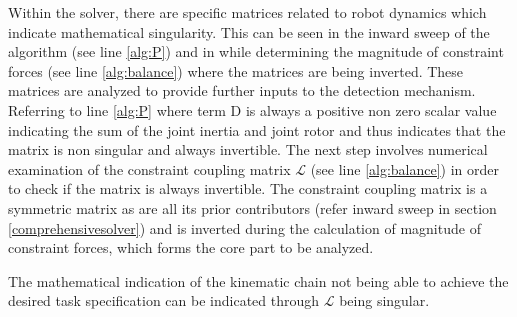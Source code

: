 Within the solver, there are specific matrices related to robot dynamics which indicate mathematical singularity. This can be seen in the inward sweep of the algorithm (see line \ref{alg:P}) and in while determining the magnitude of constraint forces (see line \ref{alg:balance}) where the matrices are being inverted. These matrices are analyzed to provide further inputs to the detection mechanism. Referring to line \ref{alg:P} where term D is always a positive non zero scalar value indicating the sum of the joint inertia and joint rotor and thus indicates that the matrix is non singular and always invertible. The next step involves numerical examination of the constraint coupling matrix $\mathcal{L}$ (see line \ref{alg:balance}) in order to check if the matrix is always invertible. The constraint coupling matrix is a symmetric matrix as are all its prior contributors (refer inward sweep in section \ref{comprehensivesolver}) and is inverted during the calculation of magnitude of constraint forces, which forms the core part to be analyzed. 
 
The mathematical indication of the kinematic chain not being able to achieve the desired task specification can be indicated through $\mathcal{L}$ being singular. 

 
 


